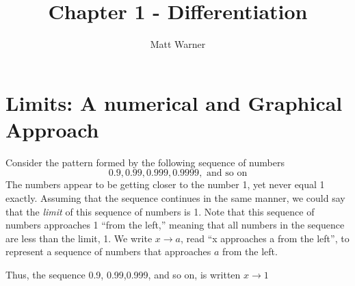 \documentclass{report}
\title{\Huge{Chapter 1 - Differentiation}}
\author{\huge{Matt Warner}}
\date{\huge{}}
\begin{document}
  \maketitle
\section*{Limits: A numerical and Graphical Approach}
\bigbreak \noindent
\begin{minipage}{0.5\textwidth}
Consider the pattern formed by the following sequence of numbers	
$$ 0.9, 0.99, 0.999, 0.9999, \text{ and so on}$$
\bigbreak \noindent \bigbreak \noindent
The numbers appear to be getting closer to the number 1, yet never equal 1 exactly. Assuming that the sequence continues in the same manner, we could say that the \textit{limit} of this sequence of numbers is 1. Note that this sequence of numbers approaches 1 ``from the left,'' meaning that all numbers in the sequence are less than the limit, 1. We write $x \rightarrow a $, read ``x approaches a from the left'', to represent a sequence of numbers that approaches $a$ from the left.
\vspace{2mm}

Thus, the sequence 0.9, 0.99,0.999, and so on, is written $x \rightarrow 1$
\end{minipage}
\begin{minipage}{0.5\textwidth}

\end{minipage}
\end{document}
